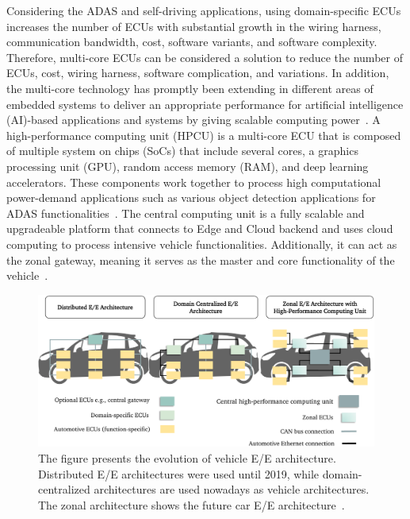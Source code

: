    Considering the ADAS and self-driving applications, using domain-specific ECUs increases the number of ECUs with substantial growth in the wiring harness, communication bandwidth, cost, software variants, and software complexity. Therefore, multi-core ECUs can be considered a solution to reduce the number of ECUs, cost, wiring harness, software complication, and variations. In addition, the multi-core technology has promptly been extending in different areas of embedded systems to deliver an appropriate performance for artificial intelligence (AI)-based applications and systems by giving scalable computing power~\cite{broy2006challenges,askaripoor2022architecture}.
    A high-performance computing unit (HPCU) is a multi-core ECU that is composed of multiple system on chips (SoCs) that include several cores, a graphics processing unit (GPU), random access memory (RAM), and deep learning accelerators. These components work together to process high computational power-demand applications such as various object detection applications for ADAS functionalities~\cite{9613692}. The central computing unit is a fully scalable and upgradeable platform that connects to Edge and Cloud backend and uses cloud computing to process intensive vehicle functionalities. Additionally, it can act as the zonal gateway, meaning it serves as the master and core functionality of the vehicle~\cite{askaripoor2022architecture}. 
    
    \begin{figure}[t]
    \centering
    \includegraphics[width=1\textwidth]{figures/eearch1.pdf}
    \caption{The figure presents the evolution of vehicle E/E architecture. Distributed E/E architectures were used until 2019, while domain-centralized architectures are used nowadays as vehicle architectures. The zonal architecture shows the future car E/E architecture~\cite{askaripoor2022architecture}.}
    \label{fig011}
    \end{figure}
    
